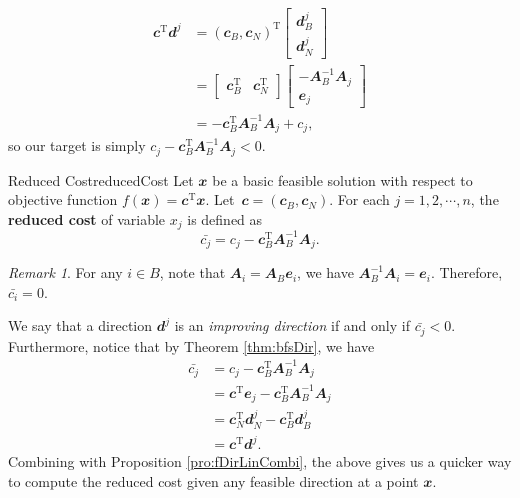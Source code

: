 \documentclass[math, code]{amznotes}
\theoremstyle{remark}
\newtheorem*{remark}{Remark}
\begin{document}
\begin{align*}
    \mathbfit{c}^{\mathrm{T}}\mathbfit{d}^j & = \left(\mathbfit{c}_B, \mathbfit{c}_N\right)^{\mathrm{T}}\begin{bmatrix}
        \mathbfit{d}^j_B \\
        \mathbfit{d}^j_N
    \end{bmatrix} \\
    & = \begin{bmatrix}
        \mathbfit{c}_B^{\mathrm{T}} & \mathbfit{c}_N^{\mathrm{T}}
    \end{bmatrix}\begin{bmatrix}
        -\mathbfit{A}_B^{-1}\mathbfit{A}_j \\
        \mathbfit{e}_j
    \end{bmatrix} \\
    & = -\mathbfit{c}_B^{\mathrm{T}}\mathbfit{A}_B^{-1}\mathbfit{A}_j + c_j,
\end{align*}
so our target is simply $c_j - \mathbfit{c}_B^{\mathrm{T}}\mathbfit{A}_B^{-1}\mathbfit{A}_j < 0$.
\begin{dfnbox}{Reduced Cost}{reducedCost}
    Let $\mathbfit{x}$ be a basic feasible solution with respect to objective function $f(\mathbfit{x}) = \mathbfit{c}^{\mathrm{T}}\mathbfit{x}$. Let~$\mathbfit{c} = \left(\mathbfit{c}_B, \mathbfit{c}_N\right)$. For each $j = 1, 2, \cdots, n$, the {\color{red} \textbf{reduced cost}} of variable $x_j$ is defined as 
    \begin{equation*}
        \bar{c_j} = c_j - \mathbfit{c}_B^{\mathrm{T}}\mathbfit{A}_B^{-1}\mathbfit{A}_j.
    \end{equation*}
\end{dfnbox}
\begin{notebox}
    \begin{remark}
        For any $i \in B$, note that $\mathbfit{A}_i = \mathbfit{A}_B\mathbfit{e}_i$, we have $\mathbfit{A}_B^{-1}\mathbfit{A}_i = \mathbfit{e}_i$. Therefore, $\bar{c_i} = 0$.
    \end{remark}
\end{notebox}
We say that a direction $\mathbfit{d}^j$ is an \textit{improving direction} if and only if $\bar{c_j} < 0$. Furthermore, notice that by Theorem \ref{thm:bfsDir}, we have
\begin{align*}
    \bar{c_j} & = c_j - \mathbfit{c}_B^{\mathrm{T}}\mathbfit{A}_B^{-1}\mathbfit{A}_j \\
    & = \mathbfit{c}^{\mathrm{T}}\mathbfit{e}_j - \mathbfit{c}_B^{\mathrm{T}}\mathbfit{A}_B^{-1}\mathbfit{A}_j \\
    & = \mathbfit{c}_N^{\mathrm{T}}\mathbfit{d}_N^j - \mathbfit{c}_B^{\mathrm{T}}\mathbfit{d}_B^j \\
    & = \mathbfit{c}^{\mathrm{T}}\mathbfit{d}^j.
\end{align*}
Combining with Proposition \ref{pro:fDirLinCombi}, the above gives us a quicker way to compute the reduced cost given any feasible direction at a point $\mathbfit{x}$.
\end{document}

